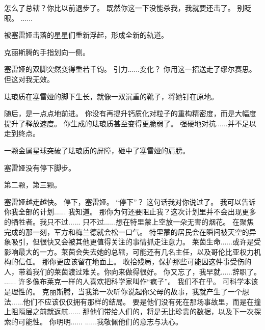 \documentclass[openany]{book}
\begin{document}
\begin{dialogue}
     怎么了总辖？你比以前退步了。
     既然你这一下没能杀我，我就要还击了。
     别眨眼。
     ......\par
    被塞雷娅击落的星星们重新浮起，形成全新的轨道。\par
    克丽斯腾的手指划向一侧。\par
    塞雷娅的双脚突然变得重若千钧。
     引力......变化？
     你用这一招送走了缪尔赛思。
     但这对我无效。\par
    珐琅质在塞雷娅的脚下生长，就像一双沉重的靴子，将她钉在原地。\par
    随后，是一点点地前进。
     你没有再提升钙质化对粒子的重构精密度，而是大幅度提升了释放速度。
     你生成的珐琅质甚至变得更脆弱了。
     强硬地对抗......并不足以走到终点。\par
    一颗金属星球突破了珐琅质的屏障，砸中了塞雷娅的肩膀。\par
    塞雷娅没有停下脚步。\par
    第二颗，第三颗。\par
    塞雷娅越走越快。
     停下，塞雷娅。
     “停下”？
     这句话我对你说过了。
     我可以告诉你我全部的计划......
     我知道。
     那你为何还要阻止我？这次计划里并不会出现更多的牺牲者。我只不过......
     只不过......想在特里蒙上空放一朵无害的烟花。
     在聚焦完成的那一刻，军方和梅兰德就会松一口气。
     特里蒙的居民会在瞬间被天空的异象吸引，但很快又会被其他更值得关注的事情抓走注意力。
     莱茵生命......或许是受影响最大的一方。莱茵会失去她的总辖，可能还有几名主任，以及哥伦比亚权力机构的信任。
     那你更应该留在地面上。
     收拾残局，保护那些可能因这件事受伤的人，带着我们的莱茵渡过难关。你向来做得很好。
     你又忘了，我早就......辞职了。
     ......
     许多像布莱克一样的人喜欢把科学家叫作“疯子”。
     我们不在乎。
     可科学本该是理性的。
     克丽斯腾，当我第一次听你说起你父母的故事，我就产生了一个想法......他们不应该仅仅拥有那样的结局。
     要是他们没有死在那场事故里，而是在撞上阻隔层之前就返航......
     那他们带给人们的，将是无比珍贵的数据，以及下一次探索的可能性。
     你明明......
     ......我敬佩他们的意志与决心。

\end{dialogue}
\end{document}
